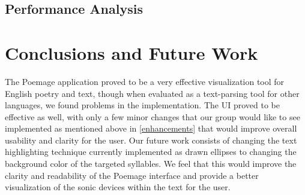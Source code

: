 \documentclass[journal]{vgtc}                %
\begin{document}
\subsection{Performance Analysis}

\section{Conclusions and Future Work} \label{conclusion}
The Poemage application proved to be a very effective visualization tool for English poetry and text, though when evaluated as a text-parsing tool for other languages, we found problems in the implementation. The UI proved to be effective as well, with only a few minor changes that our group would like to see implemented as mentioned above in \autoref{enhancements} that would improve overall usability and clarity for the user. Our future work consists of changing the text highlighting technique currently implemented as drawn ellipses to changing the background color of the targeted syllables. We feel that this would improve the clarity and readability of the Poemage interface and provide a better visualization of the sonic devices within the text for the user. 

\newpage
%

%
%
%


\end{document}
